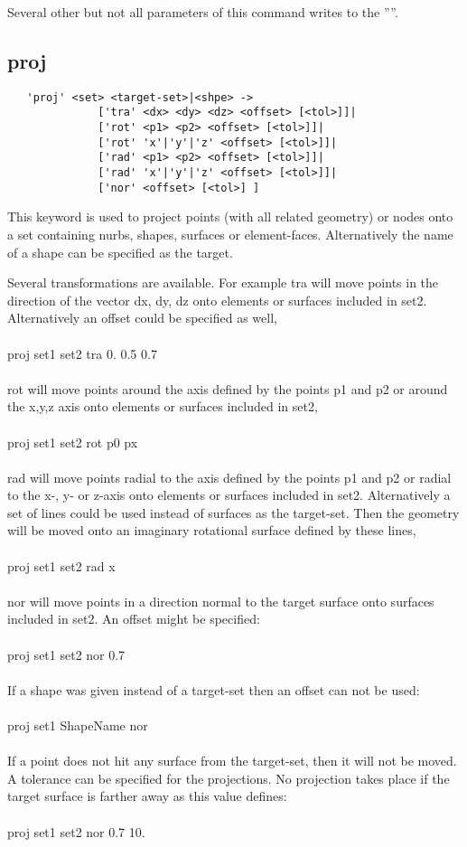 \documentclass{article}
\begin{document}
Several other but not all parameters of this command writes to the ''''.


\subsection{\label{proj}proj}
\begin{verbatim}
   'proj' <set> <target-set>|<shpe> ->
              ['tra' <dx> <dy> <dz> <offset> [<tol>]]|
              ['rot' <p1> <p2> <offset> [<tol>]]|
              ['rot' 'x'|'y'|'z' <offset> [<tol>]]|
              ['rad' <p1> <p2> <offset> [<tol>]]|
              ['rad' 'x'|'y'|'z' <offset> [<tol>]]|
              ['nor' <offset> [<tol>] ]   
\end{verbatim}
This keyword is used to project points (with all related geometry) or nodes onto a set containing nurbs, shapes, surfaces or element-faces. Alternatively the name of a shape can be specified as the target.

Several transformations are available. For example tra will move points in the direction of the vector dx, dy, dz onto elements or surfaces included in set2. Alternatively an offset could be specified as well,\\\\
proj set1 set2 tra 0. 0.5 0.7  \\\\
rot will move points around the axis defined by the points p1 and p2 or around the x,y,z axis onto elements or surfaces included in set2,\\\\
proj set1 set2 rot p0 px \\\\
rad will move points radial to the axis defined by the points p1 and p2 or radial to the x-, y- or z-axis onto elements or surfaces included in set2. Alternatively a set of lines could be used instead of surfaces as the target-set. Then the geometry will be moved onto an imaginary rotational surface defined by these lines,\\\\
proj set1 set2 rad x \\\\
nor will move points in a direction normal to the target surface onto surfaces included in set2. An offset might be specified:\\\\
proj set1 set2 nor 0.7 \\\\ 
If a shape was given instead of a target-set then an offset can not be used:\\\\
proj set1 ShapeName nor \\\\ 
If a point does not hit any surface from the target-set, then it will not be moved. A tolerance can be specified for the projections. No projection takes place if the target surface is farther away as this value defines:\\\\
proj set1 set2 nor 0.7 10. \\\\
\end{document}
